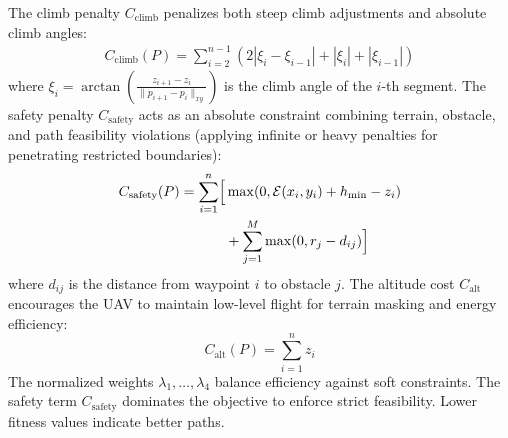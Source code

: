 \documentclass[final,5p,times]{elsarticle}
\begin{document}
The climb penalty $C_{\text{climb}}$ penalizes both steep climb adjustments and absolute climb angles:
\begin{equation}
\begin{aligned}
C_{\text{climb}}(P) = \sum_{i=2}^{n-1} \left( 2|\xi_i - \xi_{i-1}| + |\xi_i| + |\xi_{i-1}| \right)
\end{aligned}
\end{equation}
where $\xi_i = \arctan\left(\frac{z_{i+1} - z_i}{\|p_{i+1} - p_i\|_{xy}}\right)$ is the climb angle of the $i$-th segment. The safety penalty $C_{\text{safety}}$ acts as an absolute constraint combining terrain, obstacle, and path feasibility violations (applying infinite or heavy penalties for penetrating restricted boundaries):
\begin{equation}
\begin{aligned}
C_{\text{safety}}(P) = \sum_{i=1}^{n} \Bigl[ &\max(0, \mathcal{E}(x_i, y_i) + h_{\min} - z_i) \\
&+ \sum_{j=1}^{M} \max(0, r_j - d_{ij}) \Bigr]
\end{aligned}
\end{equation}
where $d_{ij}$ is the distance from waypoint $i$ to obstacle $j$.
The altitude cost $C_{\text{alt}}$ encourages the UAV to maintain low-level flight for terrain masking and energy efficiency:
\begin{equation}
C_{\text{alt}}(P) = \sum_{i=1}^{n} z_i
\end{equation}
The normalized weights $\lambda_1, \ldots, \lambda_4$ balance efficiency against soft constraints.
The safety term $C_{\text{safety}}$ dominates the objective to enforce strict feasibility.
Lower fitness values indicate better paths.
\end{document}
